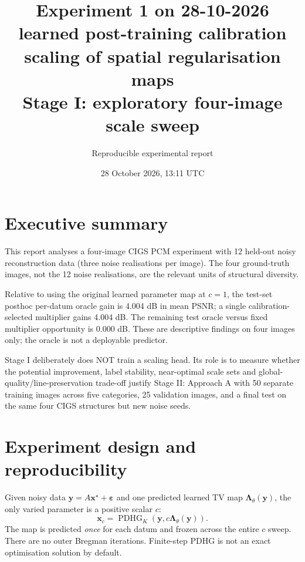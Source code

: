 \documentclass[11pt,a4paper]{article}
\begin{document}
\title{Experiment 1 on 28-10-2026\\[0.35em]\large learned post-training calibration scaling of spatial regularisation maps\\[0.5em]\normalsize Stage I: exploratory four-image scale sweep}

\author{Reproducible experimental report}

\date{28 October 2026, 13:11 UTC}

\maketitle

\tableofcontents

\clearpage

\section{Executive summary}

This report analyses a four-image CIGS PCM experiment with 12 held-out noisy reconstruction data (three noise realisations per image). The four ground-truth images, not the 12 noise realisations, are the relevant units of structural diversity.

Relative to using the original learned parameter map at $c=1$, the test-set posthoc per-datum oracle gain is 4.004 dB in mean PSNR; a single calibration-selected multiplier gains 4.004 dB. The remaining test oracle versus fixed multiplier opportunity is 0.000 dB. These are descriptive findings on four images only; the oracle is not a deployable predictor.

Stage I deliberately does NOT train a scaling head. Its role is to measure whether the potential improvement, label stability, near-optimal scale sets and global-quality/line-preservation trade-off justify Stage II: Approach A with 50 separate training images across five categories, 25 validation images, and a final test on the same four CIGS structures but new noise seeds.

\section{Experiment design and reproducibility}

Given noisy data $\boldsymbol y=A\boldsymbol x^\star+\boldsymbol\varepsilon$ and one predicted learned TV map $\boldsymbol\Lambda_\theta(\boldsymbol y)$, the only varied parameter is a positive scalar $c$:\[\boldsymbol x_c=\operatorname{PDHG}_K(\boldsymbol y,c\boldsymbol\Lambda_\theta(\boldsymbol y)).\] The map is predicted \emph{once} for each datum and frozen across the entire $c$ sweep. There are no outer Bregman iterations. Finite-step PDHG is not an exact optimisation solution by default.
\end{document}
